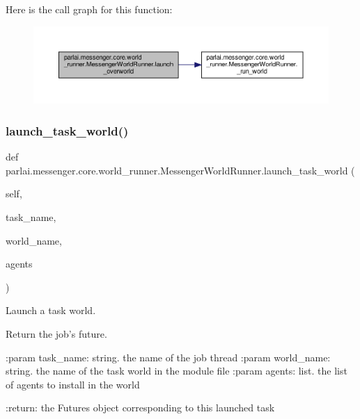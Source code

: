 Here is the call graph for this function\+:
\nopagebreak
\begin{figure}[H]
\begin{center}
\leavevmode
\includegraphics[width=350pt]{classparlai_1_1messenger_1_1core_1_1world__runner_1_1MessengerWorldRunner_a9e8caf7821b9d5bd3fedf09ef1a1b027_cgraph}
\end{center}
\end{figure}
\mbox{\label{classparlai_1_1messenger_1_1core_1_1world__runner_1_1MessengerWorldRunner_a4fc3aded0f50104a425b65def4738607}} 
\subsubsection{\texorpdfstring{launch\+\_\+task\+\_\+world()}{launch\_task\_world()}}
{\footnotesize\ttfamily def parlai.\+messenger.\+core.\+world\+\_\+runner.\+Messenger\+World\+Runner.\+launch\+\_\+task\+\_\+world (\begin{DoxyParamCaption}\item[{}]{self,  }\item[{}]{task\+\_\+name,  }\item[{}]{world\+\_\+name,  }\item[{}]{agents }\end{DoxyParamCaption})}

\begin{DoxyVerb}Launch a task world.

Return the job's future.

:param task_name:
    string. the name of the job thread
:param world_name:
    string. the name of the task world in the module file
:param agents:
    list. the list of agents to install in the world

:return:
    the Futures object corresponding to this launched task
\end{DoxyVerb}
 

